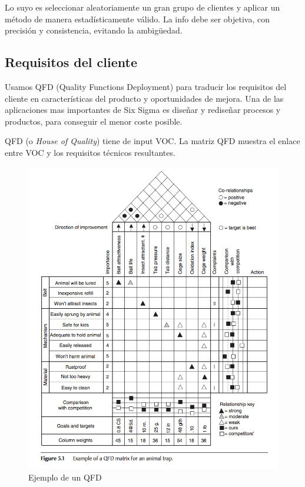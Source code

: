\documentclass[]{article}
\begin{document}
Lo suyo es seleccionar aleatoriamente un gran grupo de clientes y aplicar un método de manera estadísticamente válido. La info debe ser objetiva, con precisión y consistencia, evitando la ambigüedad. 

\subsection{Requisitos del cliente}

Usamos QFD (Quality Functions Deployment) para traducir los requisitos del cliente en características del producto y oportunidades de mejora. Una de las aplicaciones mas importantes de Six Sigma es diseñar y rediseñar procesos y productos, para conseguir el menor coste posible.

QFD (o \textit{House of Quality}) tiene de input VOC. La matriz QFD muestra el enlace entre VOC y los requisitos técnicos resultantes.

\begin{figure}[ht!]
	\centering
	\includegraphics[width=150mm]{imagenes/ExampleQFD.png}
	\caption{Ejemplo de un QFD}
	\label{fig:ExampleQFD}
\end{figure}
\end{document}
